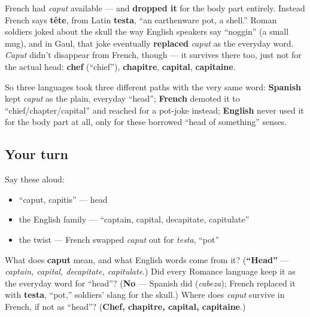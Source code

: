 \begin{culture}
French had \emph{caput} available — and \textbf{dropped it} for the body part entirely. Instead French says \textbf{tête}, from Latin \textbf{testa}, \textquotedblleft{}an earthenware pot, a shell.\textquotedblright{} Roman soldiers joked about the skull the way English speakers say \textquotedblleft{}noggin\textquotedblright{} (a small mug), and in Gaul, that joke eventually \textbf{replaced} \emph{caput} as the everyday word. \emph{Caput} didn't disappear from French, though — it survives there too, just not for the actual head: \textbf{chef} (\textquotedblleft{}chief\textquotedblright{}), \textbf{chapitre}, \textbf{capital}, \textbf{capitaine}.

So three languages took three different paths with the very same word: \textbf{Spanish} kept \emph{caput} as the plain, everyday \textquotedblleft{}head\textquotedblright{}; \textbf{French} demoted it to \textquotedblleft{}chief/chapter/capital\textquotedblright{} and reached for a pot-joke instead; \textbf{English} never used it for the body part at all, only for these borrowed \textquotedblleft{}head of something\textquotedblright{} senses.
\end{culture}

\subsection*{Your turn}
Say these aloud:

\begin{itemize}
\raggedright
  \item \textquotedblleft{}caput, capitis\textquotedblright{} — head
  \item the English family — \textquotedblleft{}captain, capital, decapitate, capitulate\textquotedblright{}
  \item the twist — French swapped \emph{caput} out for \emph{testa}, \textquotedblleft{}pot\textquotedblright{}
\end{itemize}

\begin{tcolorbox}[breakable,colback=teal!4,colframe=teal!35!black,title={Before you move on}]
What does \textbf{caput} mean, and what English words come from it? (\textbf{\textquotedblleft{}Head\textquotedblright{}} — \emph{captain, capital, decapitate, capitulate}.) Did every Romance language keep it as the everyday word for \textquotedblleft{}head\textquotedblright{}? (\textbf{No} — Spanish did (\emph{cabeza}); French replaced it with \textbf{testa}, \textquotedblleft{}pot,\textquotedblright{} soldiers' slang for the skull.) Where does \emph{caput} survive in French, if not as \textquotedblleft{}head\textquotedblright{}? (\textbf{Chef, chapitre, capital, capitaine}.)
\end{tcolorbox}
